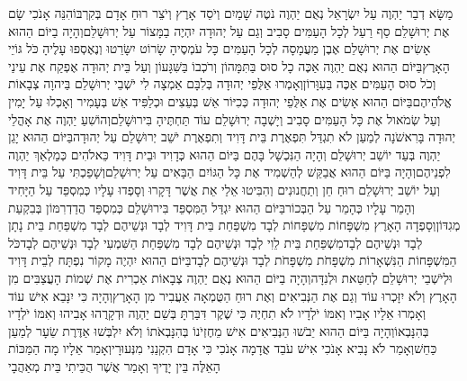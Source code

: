 \documentclass[../main/main.tex]{subfiles}
\begin{document}
\begin{multicols}{\ncols}
מַשָּׂא דְבַר יַהְוֶה עַל יִשְׂרָאֵל נְאֻם יַהְוֶה נֹטֶה שָׁמַיִם וְיֹסֵד אָרֶץ וְיֹצֵר רוּחַ אָדָם בְּקִרְבּוֹ\PreVerseSpace{}הִנֵּה אָנֹכִי שָׂם אֶת יְרוּשָׁלֵם סַף רַעַל לְכָל הָעַמִּים סָבִיב וְגַם עַל יְהוּדָה יִהְיֶה בַמָּצוֹר עַל יְרוּשָׁלֵם\PreVerseSpace{}וְהָיָה בַיּוֹם הַהוּא אָשִׂים אֶת יְרוּשָׁלֵם אֶבֶן מַעֲמָסָה לְכָל הָעַמִּים כָּל עֹמְסֶיהָ שָׂרוֹט יִשָּׂרֵטוּ וְנֶאֶסְפוּ עָלֶיהָ כֹּל גּוֹיֵי הָאָרֶץ\PreVerseSpace{}בַּיּוֹם הַהוּא נְאֻם יַהְוֶה אַכֶּה כָל סוּס בַּתִּמָּהוֹן וְרֹכְבוֹ בַּשִּׁגָּעוֹן וְעַל בֵּית יְהוּדָה אֶפְקַח אֶת עֵינַי וְכֹל סוּס הָעַמִּים אַכֶּה בַּעִוָּרוֹן\PreVerseSpace{}וְאָמְרוּ אַלֻּפֵי יְהוּדָה בְּלִבָּם אַמְצָה לִי יֹשְׁבֵי יְרוּשָׁלֵם בַּיהוָה צְבָאוֹת אֱלֹהֵיהֶם\PreVerseSpace{}בַּיּוֹם הַהוּא אָשִׂים אֶת אַלֻּפֵי יְהוּדָה כְּכִיּוֹר אֵשׁ בְּעֵצִים וּכְלַפִּיד אֵשׁ בְּעָמִיר וְאָכְלוּ עַל יָמִין וְעַל שְׂמֹאול אֶת כָּל הָעַמִּים סָבִיב וְיָשְׁבָה יְרוּשָׁלֵם עוֹד תַּחְתֶּיהָ בִּירוּשָׁלֵם\PreVerseSpace{}וְהוֹשִׁעַ יַהְוֶה אֶת אָהֳלֵי יְהוּדָה בָּרִאשֹׁנָה לְמַעַן לֹא תִגְדַּל תִּפְאֶרֶת בֵּית דָּוִיד וְתִפְאֶרֶת יֹשֵׁב יְרוּשָׁלֵם עַל יְהוּדָה\PreVerseSpace{}בַּיּוֹם הַהוּא יָגֵן יַהְוֶה בְּעַד יוֹשֵׁב יְרוּשָׁלֵם וְהָיָה הַנִּכְשָׁל בָּהֶם בַּיּוֹם הַהוּא כְּדָוִיד וּבֵית דָּוִיד כֵּאלֹהִים כְּמַלְאַךְ יַהְוֶה לִפְנֵיהֶם\PreVerseSpace{}וְהָיָה בַּיּוֹם הַהוּא אֲבַקֵּשׁ לְהַשְׁמִיד אֶת כָּל הַגּוֹיִם הַבָּאִים עַל יְרוּשָׁלֵם\PreVerseSpace{}וְשָׁפַכְתִּי עַל בֵּית דָּוִיד וְעַל יוֹשֵׁב יְרוּשָׁלֵם רוּחַ חֵן וְתַחֲנוּנִים וְהִבִּיטוּ אֵלַי אֵת אֲשֶׁר דָּקָרוּ וְסָפְדוּ עָלָיו כְּמִסְפֵּד עַל הַיָּחִיד וְהָמֵר עָלָיו כְּהָמֵר עַל הַבְּכוֹר\PreVerseSpace{}בַּיּוֹם הַהוּא יִגְדַּל הַמִּסְפֵּד בִּירוּשָׁלֵם כְּמִסְפַּד הֲדַדְרִמּוֹן\SubEnd{} בְּבִקְעַת מְגִדּוֹן\PreVerseSpace{}וְסָפְדָה הָאָרֶץ מִשְׁפָּחוֹת מִשְׁפָּחוֹת לְבָד מִשְׁפַּחַת בֵּית דָּוִיד לְבָד וּנְשֵׁיהֶם לְבָד מִשְׁפַּחַת בֵּית נָתָן לְבָד וּנְשֵׁיהֶם לְבָד\PreVerseSpace{}מִשְׁפַּחַת בֵּית לֵוִי לְבָד וּנְשֵׁיהֶם לְבָד מִשְׁפַּחַת הַשִּׁמְעִי לְבָד וּנְשֵׁיהֶם לְבָד\PreVerseSpace{}כֹּל הַמִּשְׁפָּחוֹת הַנִּשְׁאָרוֹת מִשְׁפָּחֹת מִשְׁפָּחֹת לְבָד וּנְשֵׁיהֶם לְבָד\PreChapterSpace{}בַּיּוֹם הַהוּא יִהְיֶה מָקוֹר נִפְתָּח לְבֵית דָּוִיד וּלְיֹשְׁבֵי יְרוּשָׁלֵם לְחַטַּאת וּלְנִדָּה\PreVerseSpace{}וְהָיָה בַיּוֹם הַהוּא נְאֻם יַהְוֶה צְבָאוֹת אַכְרִית אֶת שְׁמוֹת הָעֲצַבִּים מִן הָאָרֶץ וְלֹא יִזָּכְרוּ עוֹד וְגַם אֶת הַנְּבִיאִים וְאֶת רוּחַ הַטֻּמְאָה אַעֲבִיר מִן הָאָרֶץ\PreVerseSpace{}וְהָיָה כִּי יִנָּבֵא אִישׁ עוֹד וְאָמְרוּ אֵלָיו אָבִיו וְאִמּוֹ יֹלְדָיו לֹא תִחְיֶה כִּי שֶׁקֶר דִּבַּרְתָּ בְּשֵׁם יַהְוֶה וּדְקָרֻהוּ אָבִיהוּ וְאִמּוֹ יֹלְדָיו בְּהִנָּבְאוֹ\PreVerseSpace{}וְהָיָה בַּיּוֹם הַהוּא יֵבֹשׁוּ הַנְּבִיאִים אִישׁ מֵחֶזְיֹנוֹ בְּהִנָּבְאֹתוֹ וְלֹא יִלְבְּשׁוּ אַדֶּרֶת שֵׂעָר לְמַעַן כַּחֵשׁ\PreVerseSpace{}וְאָמַר לֹא נָבִיא אָנֹכִי אִישׁ עֹבֵד אֲדָמָה אָנֹכִי כִּי אָדָם הִקְנַנִי מִנְּעוּרָי\PreVerseSpace{}וְאָמַר אֵלָיו מָה הַמַּכּוֹת הָאֵלֶּה בֵּין יָדֶיךָ וְאָמַר אֲשֶׁר הֻכֵּיתִי בֵּית מְאַהֲבָי\OpenSection{}\par

\end{multicols}
\end{document}
